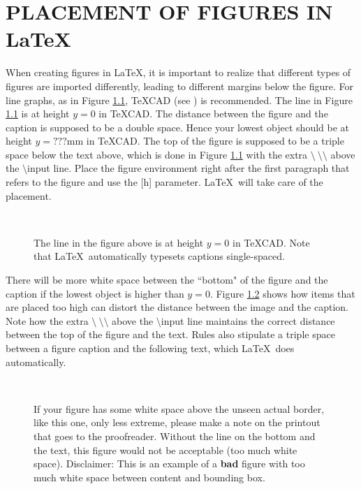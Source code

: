 \chapter{PLACEMENT OF FIGURES IN \LaTeX }\label{chap2:body1}


When creating figures in \LaTeX, it is important to realize that
different types of figures are imported differently, leading to
different margins below the figure.
For line graphs, as in Figure \ref{pg1},
\TeX CAD (see \cite{texcad}) is recommended.
The line in Figure \ref{pg1} is at height $y=0$ in \TeX CAD.
The distance between the figure and the caption is supposed to be
a double space.
Hence your lowest object should be at height $y=???$mm
in \TeX CAD.
The top of the figure is supposed to be a triple space below the
text above, which is done in Figure \ref{pg1}
with the extra $\setminus ~\setminus \setminus $ above the
$\setminus $input line.
Place the figure environment right after the first paragraph that
refers to the figure and use the [h] parameter.
\LaTeX \ will take care of the placement.


\begin{figure}[h]


\ \\

\centerline{}


\caption{
The line
in the figure above is at height $y=0$ in \TeX CAD.
Note that \LaTeX \ automatically typesets captions single-spaced.
}
\label{pg1}

\end{figure}


There will be more white space between the ``bottom" of the figure and
the caption if the lowest object is higher than $y=0$.
Figure \ref{pg3} shows how items that are placed too high can
distort the distance between the image and the caption.
Note how the extra $\setminus ~\setminus \setminus $ above the
$\setminus $input line maintains the correct distance between
the top of the figure and the text.
Rules also stipulate a triple space between a figure caption and the
following text, which \LaTeX \ does automatically.



\begin{figure}[h]

\ \\

\centerline{}
\caption{If your figure has some white space above the unseen actual border,
like this one, only less extreme, please make a note on the printout that
goes to the proofreader. Without the line on the bottom and the text,
this figure would not be acceptable (too much white space).
Disclaimer: This is an example of a {\bf bad} figure with too much
white space between content and bounding box.}
\label{pg3}

\end{figure}



